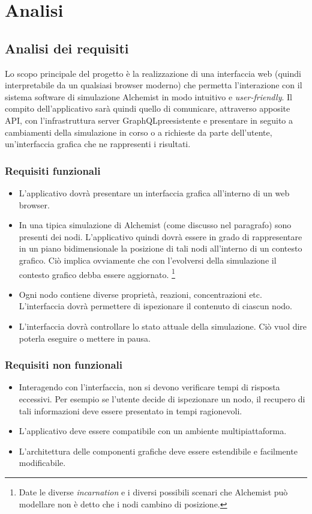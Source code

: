 \chapter{Analisi}

\section{Analisi dei requisiti}
Lo scopo principale del progetto è la realizzazione di una interfaccia web (quindi interpretabile da un qualsiasi browser moderno) che permetta l'interazione con il sistema software di simulazione
Alchemist in modo intuitivo e \textit{user-friendly}. Il compito dell'applicativo sarà quindi quello di comunicare, attraverso apposite \ac{API}, con l'infrastruttura server GraphQLpreesistente e presentare in seguito a cambiamenti della simulazione in corso o a richieste da parte dell'utente, un'interfaccia grafica che ne rappresenti i risultati.
\subsection{Requisiti funzionali}
\begin{itemize}
	\item L'applicativo dovrà presentare un interfaccia grafica all'interno di un web browser.
	\item In una tipica simulazione di Alchemist (come discusso nel paragrafo) sono presenti dei nodi. L'applicativo quindi dovrà essere in grado di rappresentare in un piano bidimensionale la posizione di tali nodi all'interno di un contesto grafico. Ciò implica ovviamente che con l'evolversi della simulazione il contesto grafico debba essere aggiornato. \footnote{Date le diverse \textit{incarnation} e i diversi possibili scenari che Alchemist può modellare non è detto che i nodi cambino di posizione.}
	\item Ogni nodo contiene diverse proprietà, reazioni, concentrazioni etc. L'interfaccia dovrà permettere di ispezionare il contenuto di ciascun nodo. 
	\item L'interfaccia dovrà controllare lo stato attuale della simulazione. Ciò vuol dire poterla eseguire o mettere in pausa.
\end{itemize}

\subsection{Requisiti non funzionali}
\begin{itemize}
	\item Interagendo con l'interfaccia, non si devono verificare tempi di risposta eccessivi. Per esempio se l'utente decide di ispezionare un nodo, il recupero di tali informazioni deve essere presentato in tempi ragionevoli.
	\item L'applicativo deve essere compatibile con un ambiente multipiattaforma.
	\item L'architettura delle componenti grafiche deve essere estendibile e facilmente modificabile.
\end{itemize}

